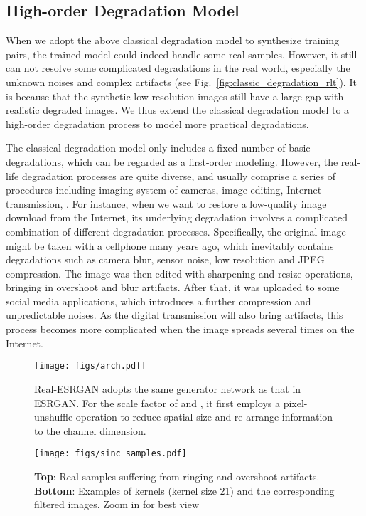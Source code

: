 \documentclass[10pt,twocolumn,letterpaper]{article}
\begin{document}
\subsection{High-order Degradation Model}
When we adopt the above classical degradation model to synthesize training pairs, the trained model could indeed handle some real samples. However, it still can not resolve some complicated degradations in the real world, especially the unknown noises and complex artifacts (see Fig.~\ref{fig:classic_degradation_rlt}).
It is because that the synthetic low-resolution images still have a large gap with realistic degraded images.
We thus extend the classical degradation model to a high-order degradation process to model more practical degradations.

The classical degradation model only includes a fixed number of  basic degradations, which can be regarded as a first-order modeling.
However, the real-life degradation processes are quite diverse, and usually comprise a series of procedures including imaging system of cameras, image editing, Internet transmission, \etc.
For instance, when we want to restore a low-quality image download from the Internet, its underlying degradation involves
a complicated combination of different degradation processes.
Specifically, the original image might be taken with a cellphone many years ago, which inevitably contains degradations such as camera blur, sensor noise, low resolution and JPEG compression.
The image was then edited with sharpening and resize operations, bringing in overshoot and blur artifacts.
After that, it was uploaded to some social media applications, which introduces a further compression and unpredictable noises. As the digital transmission will also bring artifacts, this process becomes more complicated when the image spreads several times on the Internet.
\begin{figure*}[t]
	\vspace{-0.6cm}
	\begin{center}
\texttt{[image: figs/arch.pdf]}
	\end{center}
	\vspace{-0.8cm}
	\caption{Real-ESRGAN adopts the same generator network as that in ESRGAN. For the scale factor of  and , it first employs a pixel-unshuffle operation to reduce spatial size and re-arrange information to the channel dimension.}
	\label{fig:arch}
	\vspace{-0.3cm}
\end{figure*}
\begin{figure}[h]
\begin{center}
\texttt{[image: figs/sinc\_samples.pdf]}
	\end{center}
	\vspace{-0.5cm}
	\caption{\textbf{Top}: Real samples suffering from ringing and overshoot artifacts. \textbf{Bottom}: Examples of  kernels (kernel size 21) and the corresponding filtered images. Zoom in for best view}
	\label{fig:sinc_samples}
	\vspace{-0.3cm}
\end{figure}
\end{document}
